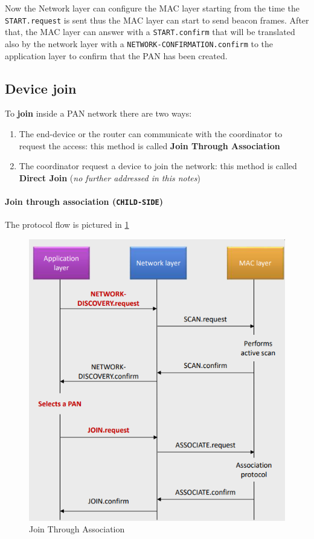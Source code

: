 \documentclass[10pt,a4paper]{report}
\theoremstyle{definition}
\begin{document}
Now the Network layer can configure the MAC layer starting from the time the \texttt{START.request} is sent thus the MAC layer can start to send beacon frames. After that, the MAC layer can answer with a \texttt{START.confirm} that will be translated also by the network layer with a \texttt{NETWORK-CONFIRMATION.confirm}  to the application layer to confirm that the PAN has been created.

\subsection{Device join}
To \textbf{join} inside a PAN network there are two ways:
\begin{enumerate}
	\item 
	The end-device or the router can communicate with the coordinator to request the access: this method is called \textbf{Join Through Association}
	\item 
	The coordinator request a device to join the network: this method is called \textbf{Direct Join} (\textit{no further addressed in this notes})
\end{enumerate}
\paragraph{Join through association (\texttt{CHILD-SIDE})}\label{sec:join-through-association-child-side}
The protocol flow is pictured in \ref{JTA-child-side}
\begin{figure}[h]
	\centering\includegraphics[scale=0.60]{images/Pasted image 20230311121914.png}
	\caption{Join Through Association}
	\label{JTA-child-side}
\end{figure}
\end{document}
